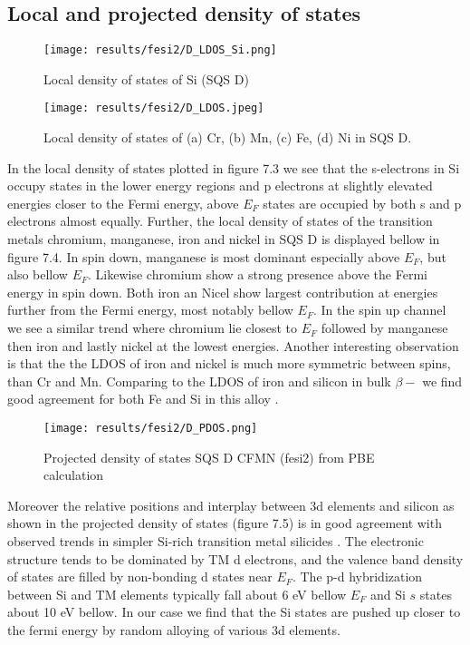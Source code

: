 \newpage
\subsection{Local and projected density of states}
  
\begin{figure}[H]
	\centering
	\texttt{[image: results/fesi2/D\_LDOS\_Si.png]}
	\caption{Local density of states of Si (SQS D)}
\end{figure} 

\begin{figure}[H]
	\centering
	\texttt{[image: results/fesi2/D\_LDOS.jpeg]}
	\caption{Local density of states of (a) Cr, (b) Mn, (c) Fe, (d) Ni in SQS D.}
\end{figure}   
  
In the local density of states plotted in figure 7.3 we see that the s-electrons in Si occupy states in the lower energy regions and p electrons at slightly elevated energies closer to the Fermi energy, above $E_F$ states are occupied by both s and p electrons almost equally. Further, the local density of states of the transition metals chromium, manganese, iron and nickel in SQS D is displayed bellow in figure 7.4. In spin down, manganese is most dominant especially above $E_F$, but also bellow $E_F$. Likewise chromium show a strong presence above the Fermi energy in spin down. Both iron an Nicel show largest contribution at energies further from the Fermi energy, most notably bellow $E_F$. In the spin up channel we see a similar trend where chromium lie closest to $E_F$ followed by manganese then iron and lastly nickel at the lowest energies. Another interesting observation is that the the LDOS of iron and nickel is much more symmetric between spins, than Cr and Mn. Comparing to the LDOS of iron and silicon in bulk $\beta-$  \cite{doi:10.1063/1.346415} we find good agreement for both Fe and Si in this alloy .

\begin{figure}[H]
	\centering
	\texttt{[image: results/fesi2/D\_PDOS.png]}
	\caption{Projected density of states SQS D CFMN (fesi2) from PBE calculation}
\end{figure} 

Moreover the relative positions and interplay between 3d elements and silicon as shown in the projected density of states (figure 7.5) is in good agreement with observed trends in simpler Si-rich transition metal silicides \cite{lange1997electronic}. The electronic structure tends to be dominated by TM d electrons, and the valence band density of states are filled by non-bonding d states near $E_F$. The p-d hybridization between Si and TM elements typically fall about 6 eV bellow $E_F$ and Si $s$ states about 10 eV bellow. In our case we find that the Si states are pushed up closer to the fermi energy by random alloying of various 3d elements.    


